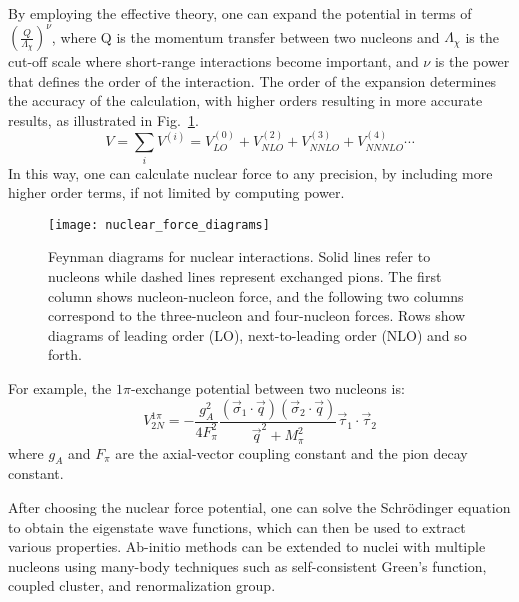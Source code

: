 By employing the effective theory, one can expand the potential in terms of
$\left(\frac{Q}{\Lambda_\chi}\right)^\nu$, where Q is the momentum transfer
between two nucleons and $\Lambda_\chi$ is the cut-off scale where short-range 
interactions become important, and $\nu$ is the power that defines the order of
the interaction. The order of the expansion determines the accuracy of the calculation, 
with higher orders resulting in more accurate results, as illustrated in Fig.~\ref{fig:nuclear_interactions_in_order}.
\begin{equation}
    V = \sum_i V^{(i)} = V^{(0)}_{LO} + V^{(2)}_{NLO} + V^{(3)}_{NNLO} + V^{(4)}_{NNNLO} \cdots
\end{equation}
In this way, one can calculate nuclear force to any precision, by including
more higher order terms, if not limited by computing power.

\begin{figure}[!h]
    \centering
    \texttt{[image: nuclear\_force\_diagrams]}
    \caption[Feynman diagrams for nuclear interactions]
    {Feynman diagrams for nuclear interactions. Solid lines refer to    
    nucleons while dashed lines represent exchanged pions. The first column     
    shows nucleon-nucleon force, and the following two columns correspond to the three-nucleon
    and four-nucleon forces. Rows show diagrams of leading order (LO), next-to-leading order (NLO) and so forth.}
    \label{fig:nuclear_interactions_in_order}
\end{figure}

For example, the $1\pi$-exchange potential between two nucleons is:
\begin{equation}
    V_{2N}^{1\pi} = -\frac{g_A^2}{4F_\pi^2}
    \frac{(\vec{\sigma}_1\cdot\vec{q})(\vec{\sigma}_2\cdot\vec{q})}{\vec{q}^2 + M^2_\pi}
    \vec{\tau}_1\cdot\vec{\tau}_2 
\end{equation}
where $g_A$ and $F_\pi$ are the axial-vector coupling constant and the pion 
decay constant.

After choosing the nuclear force potential, one can solve the Schr\"{o}dinger 
equation to obtain the eigenstate wave functions, which can then be used to
extract various properties. Ab-initio methods can be extended to nuclei with multiple nucleons using many-body techniques such as self-consistent Green's function, coupled cluster, and renormalization group.

